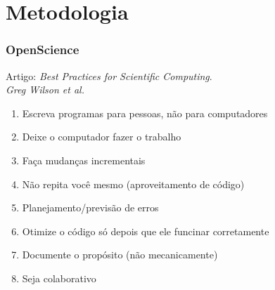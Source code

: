 \section{Metodologia}


\begin{frame}
  \frametitle{OpenScience}
  Artigo: \textit{Best Practices for Scientific Computing}. \\
          \textit{Greg Wilson et al.}
  \begin{enumerate}
    \item Escreva programas para pessoas, não para computadores
    \item Deixe o computador fazer o trabalho
    \item Faça mudanças incrementais
    \item Não repita você mesmo (aproveitamento de código)
    \item Planejamento/previsão de erros 
    \item Otimize o código só depois que ele funcinar corretamente
    \item Documente o propósito (não mecanicamente)
    \item Seja colaborativo
  \end{enumerate}
\end{frame}
